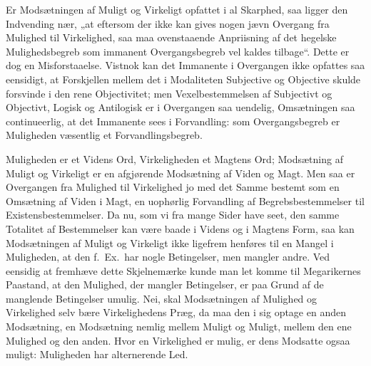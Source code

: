 \documentclass[12pt]{book}
\newcommand{\opage}[1]{\marginnote{\footnotesize\textit{[#1]}}}
\begin{document}
Er Modsætningen af Muligt og Virkeligt opfattet i al Skarphed, saa ligger den Indvending nær, „at eftersom der ikke kan gives nogen jævn Overgang fra Mulighed til Virkelighed, saa maa ovenstaaende Anpriisning af det hegelske Mulighedsbegreb som immanent Overgangsbegreb vel kaldes tilbage“. Dette er dog en Misforstaaelse. Vistnok kan det Immanente i Overgangen ikke opfattes saa eensidigt, at Forskjellen mellem det i Modaliteten Subjective og Objective skulde forsvinde i den rene Objectivitet; men Vexelbestemmelsen af Subjectivt og Objectivt, Logisk og Antilogisk er i Overgangen saa uendelig, Omsætningen saa continueerlig, at det Immanente sees i Forvandling: som Overgangsbegreb er Muligheden væsentlig et Forvandlingsbegreb.

Muligheden er et Videns Ord, Virkeligheden et Magtens Ord; Modsætning af Muligt og Virkeligt er en afgjørende Modsætning af Viden og Magt. Men saa er Overgangen fra Mulighed til Virkelighed jo med det Samme bestemt som en Omsætning af Viden i Magt, en uophørlig Forvandling af Begrebsbestemmelser til Existensbestemmelser. Da nu, som vi fra mange Sider have seet, den samme Totalitet af Bestemmelser kan være baade i Videns og i Magtens Form,
\opage{239}saa kan Modsætningen af Muligt og Virkeligt ikke ligefrem henføres til en Mangel i Muligheden, at den f.\ Ex.\ har nogle Betingelser, men mangler andre. Ved eensidig at fremhæve dette Skjelnemærke kunde man let komme til Megarikernes Paastand, at den Mulighed, der mangler Betingelser, er paa Grund af de manglende Betingelser umulig. Nei, skal Modsætningen af Mulighed og Virkelighed selv bære Virkelighedens Præg, da maa den i sig optage en anden Modsætning, en Modsætning nemlig mellem Muligt og Muligt, mellem den ene Mulighed og den anden. Hvor en Virkelighed er mulig, er dens Modsatte ogsaa muligt: Muligheden har alternerende Led.
\end{document}
